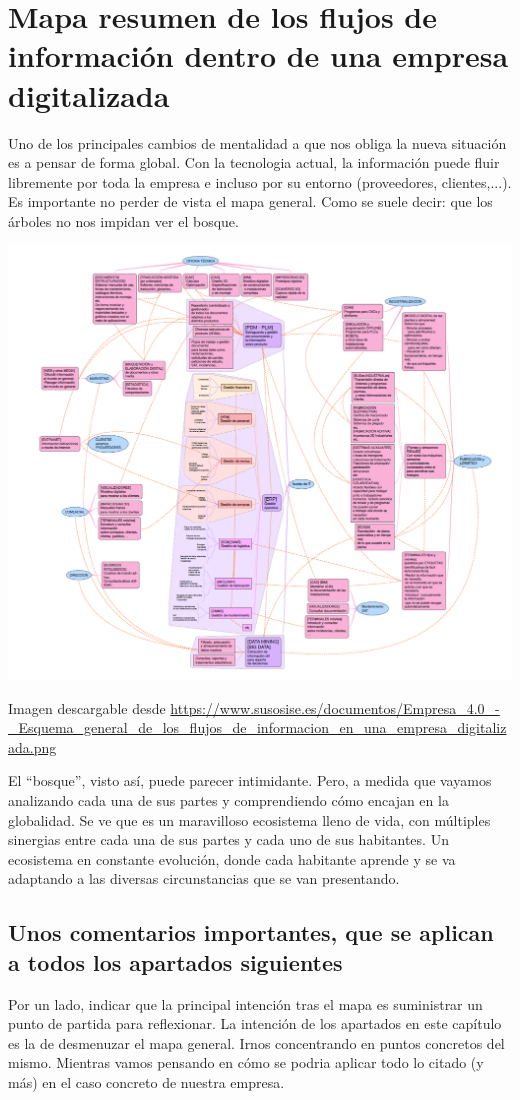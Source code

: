 \documentclass[spanish,12pt,a4paper,final,oneside]{book}
\begin{document}
\newpage
\section{Mapa resumen de los flujos de información dentro de una empresa digitalizada}
Uno de los principales cambios de mentalidad a que nos obliga la nueva situación es a pensar de forma global. Con la tecnologia actual, la información puede fluir libremente por toda la empresa e incluso por su entorno (proveedores, clientes,...). Es importante no perder de vista el mapa general. Como se suele decir: que los árboles no nos impidan ver el bosque.

\includegraphics[width=1.1\textwidth]{Esquema general de los flujos de informacion en una empresa digitalizada}

Imagen descargable desde \url{https://www.susosise.es/documentos/Empresa_4.0_-_Esquema_general_de_los_flujos_de_informacion_en_una_empresa_digitalizada.png}

El ``bosque'', visto así, puede parecer intimidante. Pero, a medida que vayamos analizando cada una de sus partes y comprendiendo cómo encajan en la globalidad. Se ve que es un maravilloso ecosistema lleno de vida, con múltiples sinergias entre cada una de sus partes y cada uno de sus habitantes. Un ecosistema en constante evolución, donde cada habitante aprende y se va adaptando a las diversas circunstancias que se van presentando.

\subsection{Unos comentarios importantes, que se aplican a todos los apartados siguientes}
Por un lado,  indicar que la principal intención tras el mapa es suministrar un punto de partida para reflexionar. La intención de los apartados en este capítulo es la de desmenuzar el mapa general. Irnos concentrando en puntos concretos del mismo. Mientras vamos pensando en cómo se podria aplicar todo lo citado (y más) en el caso concreto de nuestra empresa.
\end{document}

